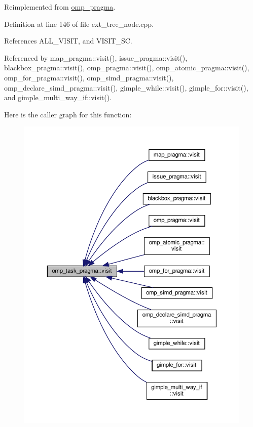 Reimplemented from \hyperlink{structomp__pragma_a2e2c445528b7e097ae76fa618a9970b5}{omp\+\_\+pragma}.



Definition at line 146 of file ext\+\_\+tree\+\_\+node.\+cpp.



References A\+L\+L\+\_\+\+V\+I\+S\+IT, and V\+I\+S\+I\+T\+\_\+\+SC.



Referenced by map\+\_\+pragma\+::visit(), issue\+\_\+pragma\+::visit(), blackbox\+\_\+pragma\+::visit(), omp\+\_\+pragma\+::visit(), omp\+\_\+atomic\+\_\+pragma\+::visit(), omp\+\_\+for\+\_\+pragma\+::visit(), omp\+\_\+simd\+\_\+pragma\+::visit(), omp\+\_\+declare\+\_\+simd\+\_\+pragma\+::visit(), gimple\+\_\+while\+::visit(), gimple\+\_\+for\+::visit(), and gimple\+\_\+multi\+\_\+way\+\_\+if\+::visit().

Here is the caller graph for this function\+:
\nopagebreak
\begin{figure}[H]
\begin{center}
\leavevmode
\includegraphics[width=350pt]{d8/d27/structomp__task__pragma_ad7ce2ba5852e3a4404ef8dad6c6034be_icgraph}
\end{center}
\end{figure}


